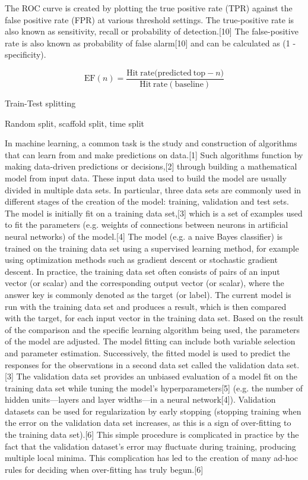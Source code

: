 The ROC curve is created by plotting the true positive rate (TPR) against the false positive rate (FPR) at various threshold settings. The true-positive rate is also known as sensitivity, recall or probability of detection.[10] The false-positive rate is also known as probability of false alarm[10] and can be calculated as (1 - specificity).

\begin{equation}
    \mathrm{EF}(n) = \frac{\mathrm{Hit\: rate (predicted\: top - }n)}{\mathrm{Hit\: rate (baseline)}}
\end{equation}

Train-Test splitting

Random split, scaffold split, time split

In machine learning, a common task is the study and construction of algorithms that can learn from and make predictions on data.[1] Such algorithms function by making data-driven predictions or decisions,[2] through building a mathematical model from input data. These input data used to build the model are usually divided in multiple data sets. In particular, three data sets are commonly used in different stages of the creation of the model: training, validation and test sets.
The model is initially fit on a training data set,[3] which is a set of examples used to fit the parameters (e.g. weights of connections between neurons in artificial neural networks) of the model.[4] The model (e.g. a naive Bayes classifier) is trained on the training data set using a supervised learning method, for example using optimization methods such as gradient descent or stochastic gradient descent. In practice, the training data set often consists of pairs of an input vector (or scalar) and the corresponding output vector (or scalar), where the answer key is commonly denoted as the target (or label). The current model is run with the training data set and produces a result, which is then compared with the target, for each input vector in the training data set. Based on the result of the comparison and the specific learning algorithm being used, the parameters of the model are adjusted. The model fitting can include both variable selection and parameter estimation.
Successively, the fitted model is used to predict the responses for the observations in a second data set called the validation data set.[3] The validation data set provides an unbiased evaluation of a model fit on the training data set while tuning the model's hyperparameters[5] (e.g. the number of hidden units—layers and layer widths—in a neural network[4]). Validation datasets can be used for regularization by early stopping (stopping training when the error on the validation data set increases, as this is a sign of over-fitting to the training data set).[6] This simple procedure is complicated in practice by the fact that the validation dataset's error may fluctuate during training, producing multiple local minima. This complication has led to the creation of many ad-hoc rules for deciding when over-fitting has truly begun.[6]
